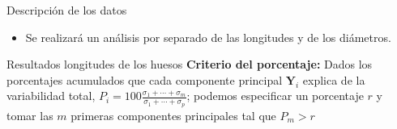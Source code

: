 \documentclass{beamer}
\begin{document}
\begin{frame}{Descripción de los datos}
\begin{itemize}
\begin{columns}
\begin{column}{0.4\textwidth}
    \end{column}
    \end{columns}
    \vskip 0.5cm
    \item Se realizará un análisis por separado de las longitudes y de los diámetros.
\end{itemize}
\end{frame}

\begin{frame}{Resultados longitudes de los huesos}
\textbf{Criterio del porcentaje:} Dados los porcentajes acumulados que cada componente principal $\mathbf{Y}_i$ explica de la variabilidad total, $P_i =  100 \frac{\sigma_1 + \cdots + \sigma_m}{\sigma_1 + \cdots + \sigma_p}$; podemos especificar un porcentaje $r$ y tomar las $m$ primeras componentes principales tal que $P_m > r$
\vskip 0.4cm
    
\end{frame}
\end{document}
